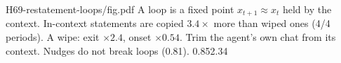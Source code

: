 {H69-restatement-loops/fig.pdf}
{A loop is a fixed point $x_{t+1}\approx x_t$ held by the context.}
{In-context statements are copied $3.4\times$ more than wiped ones (4/4 periods). A wipe: exit $\times2.4$, onset $\times0.54$.}
{Trim the agent's own chat from its context. Nudges do not break loops (0.81).}
{0.85}{2.34}
